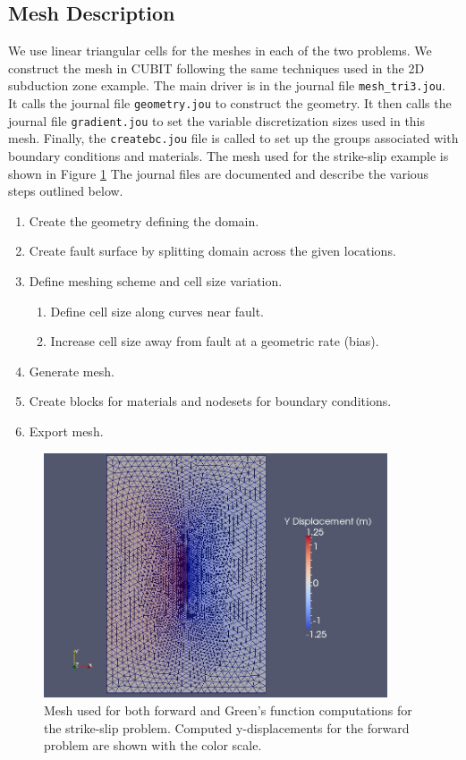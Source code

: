\subsection{Mesh Description}

We use linear triangular cells for the meshes in each of the two problems.
We construct the mesh in CUBIT following the same techniques used
in the 2D subduction zone example. The main driver is in the journal
file \texttt{mesh\_tri3.jou}. It calls the journal file \texttt{geometry.jou}
to construct the geometry. It then calls the journal file \texttt{gradient.jou}
to set the variable discretization sizes used in this mesh. Finally,
the \texttt{createbc.jou} file is called to set up the groups associated
with boundary conditions and materials. The mesh used for the strike-slip
example is shown in Figure \ref{fig:greensfns2d-strikeslip-mesh}
The journal files are documented and describe the various steps outlined
below.
\begin{enumerate}
\item Create the geometry defining the domain.
\item Create fault surface by splitting domain across the given locations.
\item Define meshing scheme and cell size variation.

\begin{enumerate}
\item Define cell size along curves near fault.
\item Increase cell size away from fault at a geometric rate (bias).
\end{enumerate}
\item Generate mesh.
\item Create blocks for materials and nodesets for boundary conditions.
\item Export mesh.
\end{enumerate}
\begin{figure}
\begin{centering}
\includegraphics[width=4in]{tutorials/greensfns2d/figs/strikeslip_ydispl2}
\par\end{centering}

\caption{Mesh used for both forward and Green's function computations for the
strike-slip problem. Computed y-displacements for the forward problem
are shown with the color scale.\label{fig:greensfns2d-strikeslip-mesh}}
\end{figure}



